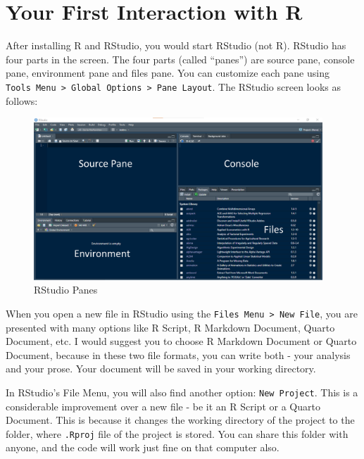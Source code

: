\documentclass[
  letterpaper,
  paper =a4,
  twoside,
  openright,
  headsepline,
  footsepline,
  listof = totocnumbered,
  chapterprefix = true,
  firstiscover]{scrbook}
\begin{document}
\hypertarget{your-first-interaction-with-r}{%
\section{Your First Interaction with
R}\label{your-first-interaction-with-r}}

After installing R and RStudio, you would start RStudio (not R). RStudio
has four parts in the screen. The four parts (called ``panes'') are
source pane, console pane, environment pane and files pane. You can
customize each pane using
\texttt{Tools\ Menu\ \textgreater{}\ Global\ Options\ \textgreater{}\ Pane\ Layout}.
The RStudio screen looks as follows:

\begin{figure}[h]

{\centering \includegraphics[width=4.27in,height=\textheight]{images/RStudio-panes.png}

}

\caption{\label{fig-rstudio-panes}RStudio Panes}

\end{figure}

When you open a new file in RStudio using the
\texttt{Files\ Menu\ \textgreater{}\ New\ File}, you are presented with
many options like R Script, R Markdown Document, Quarto Document, etc. I
would suggest you to choose R Markdown Document or Quarto Document,
because in these two file formats, you can write both - your analysis
and your prose. Your document will be saved in your working directory.

In RStudio's File Menu, you will also find another option:
\texttt{New\ Project}. This is a considerable improvement over a new
file - be it an R Script or a Quarto Document. This is because it
changes the working directory of the project to the folder, where
\texttt{.Rproj} file of the project is stored. You can share this folder
with anyone, and the code will work just fine on that computer also.
\end{document}
